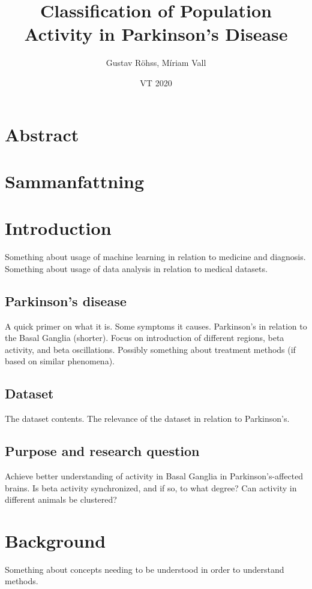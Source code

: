 \documentclass{article}
\title{Classification of Population Activity in Parkinson's Disease}
\author{Gustav Röhss, Míriam Vall}
\date{VT 2020}
\begin{document}
\maketitle

\section*{Abstract}
\section*{Sammanfattning}

\newpage
\tableofcontents

\newpage
\section{Introduction}
Something about usage of machine learning in relation to medicine and diagnosis.
Something about usage of data analysis in relation to medical datasets.

\subsection{Parkinson's disease}
A quick primer on what it is.
Some symptoms it causes.
Parkinson's in relation to the Basal Ganglia (shorter).
Focus on introduction of different regions, beta activity, and beta oscillations.
Possibly something about treatment methods (if based on similar phenomena).

\subsection{Dataset}
The dataset contents.
The relevance of the dataset in relation to Parkinson's.

\subsection{Purpose and research question}
Achieve better understanding of activity in Basal Ganglia in Parkinson's-affected brains.
Is beta activity synchronized, and if so, to what degree?
Can activity in different animals be clustered?

\newpage
\section{Background}
Something about concepts needing to be understood in order to understand methods.
\end{document}
